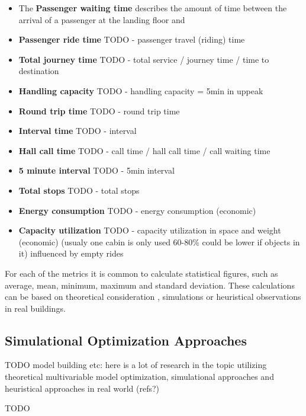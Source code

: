 \begin{itemize}
    \item The \textbf{Passenger waiting time} describes the amount of time between the arrival of a passenger at the landing floor and  
    \item \textbf{Passenger ride time} TODO - passenger travel (riding) time
    \item \textbf{Total journey time} TODO  - total service / journey time / time to destination
    \item \textbf{Handling capacity} TODO - handling capacity = 5min in uppeak \autocite[][pp.8-9]{siikonen1997models}
    \item \textbf{Round trip time} TODO - round trip time
    \item \textbf{Interval time} TODO - interval
    \item \textbf{Hall call time} TODO - call time / hall call time / call waiting time
    \item \textbf{5 minute interval} TODO - 5min interval \autocite[][p.~194]{unger2015aufzuege}
    \item \textbf{Total stops} TODO - total stops
        \item \textbf{Energy consumption} TODO - energy consumption (economic)
    \item \textbf{Capacity utilization} TODO - capacity utilization in space and weight (economic)
        (usualy one cabin is only used 60-80\% could be lower if objects in it)
        \autocite[][p.~194]{unger2015aufzuege}
        \autocite[][p.~7]{hakonen2003simulation}
        influenced by empty rides
\end{itemize}

For each of the metrics it is common to calculate statistical figures, such as average, mean, minimum, maximum and standard deviation.
These calculations can be based on theoretical consideration \autocite[][p.~194]{unger2015aufzuege}, simulations or heuristical observations in real buildings.
 



\subsection{Simulational Optimization Approaches}
TODO
model building etc: here is a lot of research in the topic utilizing theoretical multivariable model optimization, simulational approaches and heuristical approaches in real world (refs?)

\autocite[][pp.~7--11]{beers2015arrivals}
\autocite[][p.~193]{unger2015aufzuege}


TODO
